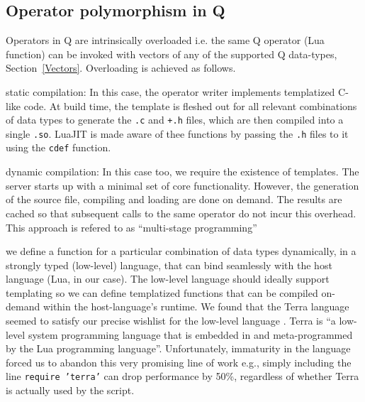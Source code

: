 \subsection{Operator polymorphism in Q}
\label{polymorphism}

Operators in Q are intrinsically overloaded i.e. the same Q operator
(Lua function) can be invoked with vectors of any of the supported Q data-types,
Section~\ref{Vectors}.
Overloading is achieved as follows.
\be
\item static compilation: In this case, the operator writer implements
  templatized C-like code. At build time, the template is fleshed out for all
  relevant combinations of data types to generate the {\tt .c} and {\tt +.h}
  files, which are then compiled into a single {\tt .so}. LuaJIT is made aware
  of thee functions by passing the {\tt .h} files to it using 
the {\tt cdef} function.
\item dynamic compilation: 
  In this case too, we require the existence of templates. 
  The server starts up with a minimal set of core functionality. 
  However, the generation of the source file, compiling and loading
  are done on demand. The results are cached
  so that subsequent calls to the same operator do not incur this overhead.
  This approach is refered to as  ``multi-stage programming''
\item we define a function for a particular combination of data types
  dynamically, in a strongly typed (low-level) language, that can bind seamlessly
  with the host language (Lua, in our case). The low-level language should ideally support templating so we can define templatized functions that can be compiled on-demand within the host-language's runtime.
  We found that the Terra language seemed to satisfy our precise wishlist for
  the low-level language \cite{devito2015}.
Terra is ``a low-level system programming language that is embedded in and
meta-programmed by the Lua programming language''. Unfortunately, immaturity in
the language forced us to abandon this very promising line of work e.g., simply
including the line {\tt require 'terra'} can drop performance by 50\%,
regardless of whether Terra is actually used by the script.
\ee

